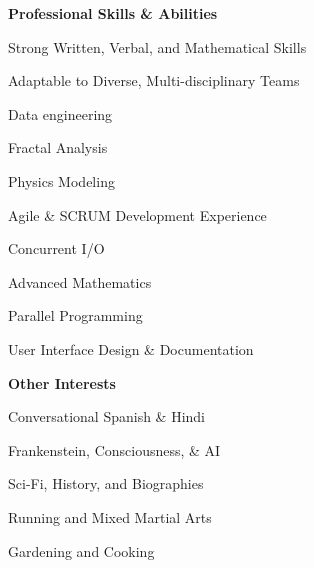 \documentclass[letterpaper,final]{memoir}
\newcommand{\LargeSep}{\vspace{1.3em}}
\newcommand{\Sep}{\vspace{1.0em}}
\newcommand{\SmallSep}{\vspace{0.4em}}
\newcommand{\CVItem}[1]
	{\textbf{\color{Blue} #1}}
\begin{document}
\CVItem{Professional Skills \& Abilities}
\Sep

\begin{multicols}{2}

    \begin{compactitem}[\color{Blue}$\circ$]

        \item Strong Written, Verbal, and Mathematical Skills
        \item Adaptable to Diverse, Multi-disciplinary Teams
        \item Data engineering
        \item Fractal Analysis
        \item Physics Modeling
        \SmallSep
   
        \item Agile \& SCRUM Development Experience
        \item Concurrent I/O
        \item Advanced Mathematics
        \item Parallel Programming
        \item User Interface Design \&  Documentation
        \SmallSep
        
	\end{compactitem}

\end{multicols}

\Sep

\CVItem{Other Interests}
\Sep

\begin{multicols}{2}

    \begin{compactitem}[\color{Blue}$\circ$] 
        
        \item Conversational Spanish \& Hindi
        \item Frankenstein, Consciousness, \& AI


        \item Sci-Fi, History, and Biographies
		\item Running and Mixed Martial Arts

        
        \item Gardening and Cooking
        

	\end{compactitem}
\end{multicols}
\LargeSep

\end{document}
